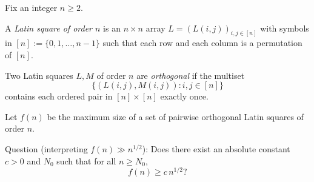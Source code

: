 Fix an integer $n\ge 2$.

A \emph{Latin square of order $n$} is an $n\times n$ array $L=(L(i,j))_{i,j\in[n]}$ with symbols in $[n]:=\{0,1,\dots,n-1\}$ such that each row and each column is a permutation of $[n]$.

Two Latin squares $L,M$ of order $n$ are \emph{orthogonal} if the multiset
\[
\{(L(i,j),M(i,j)) : i,j\in[n]\}
\]
contains each ordered pair in $[n]\times[n]$ exactly once.

Let $f(n)$ be the maximum size of a set of pairwise orthogonal Latin squares of order $n$.

Question (interpreting $f(n)\gg n^{1/2}$): Does there exist an absolute constant $c>0$ and $N_0$ such that for all $n\ge N_0$,
\[
 f(n) \ge c\, n^{1/2}?
\]
